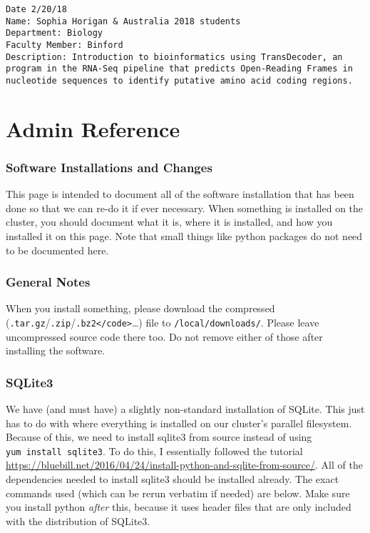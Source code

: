 \documentclass[]{book}
\begin{document}
\begin{verbatim}
Date 2/20/18
Name: Sophia Horigan & Australia 2018 students
Department: Biology
Faculty Member: Binford
Description: Introduction to bioinformatics using TransDecoder, an program in the RNA-Seq pipeline that predicts Open-Reading Frames in nucleotide sequences to identify putative amino acid coding regions.
\end{verbatim}

\chapter{Admin Reference}\label{admin-reference}

\subsection{Software Installations and
Changes}\label{software-installations-and-changes}

This page is intended to document all of the software installation that
has been done so that we can re-do it if ever necessary. When something
is installed on the cluster, you should document what it is, where it is
installed, and how you installed it on this page. Note that small things
like python packages do not need to be documented here.

\subsection{General Notes}\label{general-notes}

When you install something, please download the compressed
(\texttt{.tar.gz}/\texttt{.zip}/\texttt{.bz2\textless{}/code\textgreater{}}\ldots{})
file to \texttt{/local/downloads/}. Please leave uncompressed source
code there too. Do not remove either of those after installing the
software.

\subsection{SQLite3}\label{sqlite3}

We have (and must have) a slightly non-standard installation of SQLite.
This just has to do with where everything is installed on our cluster's
parallel filesystem. Because of this, we need to install sqlite3 from
source instead of using \texttt{yum\ install\ sqlite3}. To do this, I
essentially followed the tutorial
\href{Here}{https://bluebill.net/2016/04/24/install-python-and-sqlite-from-source/}.
All of the dependencies needed to install sqlite3 should be installed
already. The exact commands used (which can be rerun verbatim if needed)
are below. Make sure you install python \emph{after} this, because it
uses header files that are only included with the distribution of
SQLite3.
\end{document}
